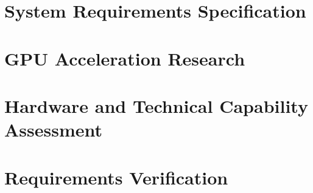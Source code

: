 \section{System Requirements Specification}\label{app:srs}


\section{GPU Acceleration Research}\label{app:gpu}


\section{Hardware and Technical Capability Assessment}\label{app:hardware}


\section{Requirements Verification}\label{app:verification}



